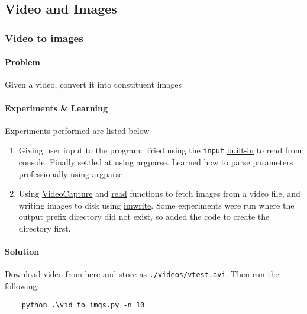 \subsection{Video and Images}

\subsubsection{Video to images}

\paragraph{Problem} Given a video, convert it into constituent images

\paragraph{Experiments \& Learning} Experiments performed are listed below

\begin{enumerate}
    \item Giving user input to the program: Tried using the \texttt{input} \href{https://docs.python.org/3/library/functions.html#input}{built-in} to read from console. Finally settled at using \href{https://docs.python.org/3.10/library/argparse.html#module-argparse}{argparse}. Learned how to parse parameters professionally using argparse.
    \item Using \href{https://docs.opencv.org/4.x/d8/dfe/classcv_1_1VideoCapture.html}{VideoCapture} and \href{https://docs.opencv.org/4.x/d8/dfe/classcv_1_1VideoCapture.html#a473055e77dd7faa4d26d686226b292c1}{read} functions to fetch images from a video file, and writing images to disk using \href{https://docs.opencv.org/4.x/d4/da8/group__imgcodecs.html#gabbc7ef1aa2edfaa87772f1202d67e0ce}{imwrite}. Some experiments were run where the output prefix directory did not exist, so added the code to create the directory first.
\end{enumerate}

\paragraph{Solution}

Download video from \href{https://github.com/opencv/opencv/blob/master/samples/data/vtest.avi}{here} and store as \texttt{./videos/vtest.avi}. Then run the following

\begin{verbatim}
    python .\vid_to_imgs.py -n 10
\end{verbatim}


